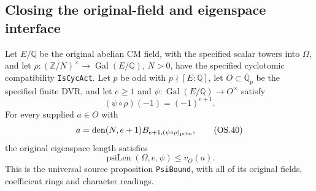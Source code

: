 \subsection{Closing the original-field and eigenspace interface}

\begin{theorem}
Let $E/\mathbb Q$ be the original abelian CM field, with the
specified scalar towers into $\Omega$, and let
$\rho:(\mathbb Z/N)^\times\to\operatorname{Gal}(E/\mathbb Q)$,
$N>0$, have the specified cyclotomic compatibility
\texttt{IsCycAct}.  Let $p$ be odd with $p\nmid[E:\mathbb Q]$,
let $O\subset\overline{\mathbb Q}_p$ be the specified finite DVR,
and let $e\ge1$ and
$\psi:\operatorname{Gal}(E/\mathbb Q)\to O^\times$ satisfy
\[
                 (\psi\circ\rho)(-1)=(-1)^{e+1}.
\]
For every supplied $a\in O$ with
\[
           a=\operatorname{den}(N,e+1)
                 B_{e+1,(\psi\circ\rho)_{\rm prim}},
 \tag{OS.40}
\]
the original eigenspace length satisfies
\[
                         \operatorname{psiLen}(\Omega,e,\psi)
                                  \le v_O(a).
 \tag{OS.41}
\]
This is the universal source proposition \texttt{PsiBound}, with
all of its original fields, coefficient rings and character readings.
\end{theorem}
